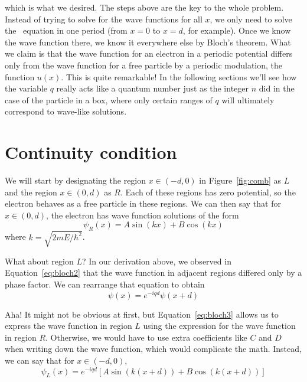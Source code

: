 which is what we desired. The steps above are the key to the whole problem. Instead of trying to solve for the wave functions for all $x$, we only need to solve the \Sch\ equation in one period (from $x=0$ to $x=d$, for example). Once we know the wave function there, we know it everywhere else by Bloch's theorem. What we claim is that the wave function for an electron in a periodic potential differs only from the wave function for a free particle by a periodic modulation, the function $u(x)$. This is quite remarkable! In the following sections we'll see how the variable $q$ really acts like a quantum number just as the integer $n$ did in the case of the particle in a box, where only certain ranges of $q$ will ultimately correspond to wave-like solutions.


\section{Continuity condition}
We will start by designating the region $x \in (-d,0)$ in Figure~\ref{fig:comb} as $L$ and the region $x \in (0,d)$ as $R$. Each of these regions has zero potential, so the electron behaves as a free particle in these regions. We can then say that for $x \in (0,d)$, the electron has wave function solutions of the form 
\begin{equation}
	\psi_R(x) = A\sin(kx) + B\cos(kx) \label{eq:kpr}
\end{equation}
where $k = \sqrt{2mE/\hbar^2}$. \par 

What about region $L$? In our derivation above, we observed in Equation~\ref{eq:bloch2} that the wave function in adjacent regions differed only by a phase factor. We can rearrange that equation to obtain
\begin{equation}
	\psi(x) = e^{-iqd}\psi(x+d) \label{eq:bloch3}
\end{equation}

Aha! It might not be obvious at first, but Equation~\ref{eq:bloch3} allows us to express the wave function in region $L$ using the expression for the wave function in region $R$. Otherwise, we would have to use extra coefficients like $C$ and $D$ when writing down the wave function, which would complicate the math. Instead, we can say that for $x \in (-d,0)$, 
\begin{equation}
	\psi_L(x) = e^{-iqd}\left[A\sin(k(x+d)) + B\cos(k(x+d))\right] \label{eq:kpl}
\end{equation}

